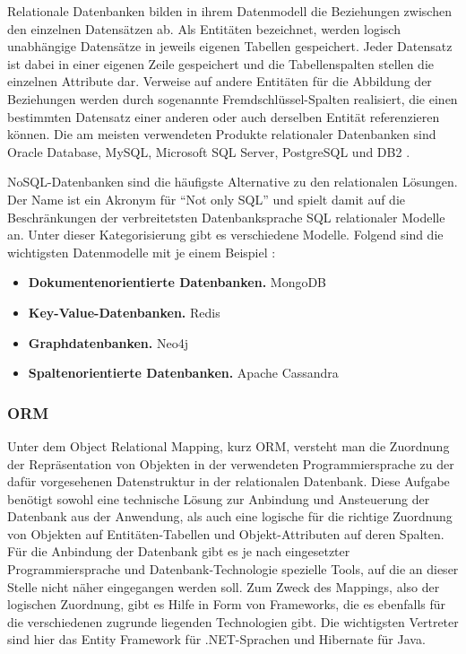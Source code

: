 Relationale Datenbanken bilden in ihrem Datenmodell die Beziehungen zwischen den einzelnen Datensätzen ab.
Als Entitäten bezeichnet, werden logisch unabhängige Datensätze in jeweils eigenen Tabellen gespeichert. Jeder Datensatz ist dabei in einer eigenen Zeile gespeichert und die Tabellenspalten stellen die einzelnen Attribute dar.
Verweise auf andere Entitäten für die Abbildung der Beziehungen werden durch sogenannte Fremdschlüssel-Spalten realisiert, die einen bestimmten Datensatz einer anderen oder auch derselben Entität referenzieren können.
Die am meisten verwendeten Produkte relationaler Datenbanken sind Oracle Database, MySQL, Microsoft SQL Server, PostgreSQL und DB2 \cite{solidIT2017}.

\acs{NoSQL}-Datenbanken sind die häufigste Alternative zu den relationalen Lösungen. Der Name ist ein Akronym für \enquote{Not only SQL} und spielt damit auf die Beschränkungen der verbreitetsten Datenbanksprache \acs{SQL} relationaler Modelle an.
Unter dieser Kategorisierung gibt es verschiedene Modelle. Folgend sind die wichtigsten Datenmodelle mit je einem Beispiel \cite{solidIT2017a}:

\begin{itemize}
\item\textbf{Dokumentenorientierte Datenbanken.} MongoDB
\item\textbf{Key-Value-Datenbanken.} Redis
\item\textbf{Graphdatenbanken.} Neo4j
\item\textbf{Spaltenorientierte Datenbanken.} Apache Cassandra
\end{itemize}

\subsubsection{ORM}
Unter dem Object Relational Mapping, kurz \acs{ORM}, versteht man die Zuordnung der Repräsentation von Objekten in der verwendeten Programmiersprache zu der dafür vorgesehenen Datenstruktur in der relationalen Datenbank.
Diese Aufgabe benötigt sowohl eine technische Lösung zur Anbindung und Ansteuerung der Datenbank aus der Anwendung, als auch eine logische für die richtige Zuordnung von Objekten auf Entitäten-Tabellen und Objekt-Attributen auf deren Spalten.
Für die Anbindung der Datenbank gibt es je nach eingesetzter Programmiersprache und Datenbank-Technologie spezielle Tools, auf die an dieser Stelle nicht näher eingegangen werden soll.
Zum Zweck des Mappings, also der logischen Zuordnung, gibt es Hilfe in Form von Frameworks, die es ebenfalls für die verschiedenen zugrunde liegenden Technologien gibt.
Die wichtigsten Vertreter sind hier das Entity Framework für .NET-Sprachen und Hibernate für Java.

